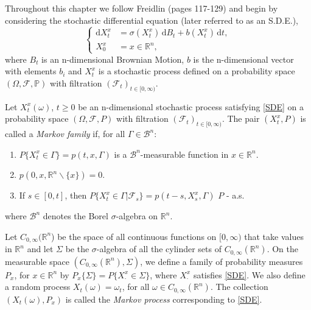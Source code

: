 \documentclass[a4paper,12pt,draft]{report}
\theoremstyle{remark}
\theoremstyle{definition}
\begin{document}
Throughout this chapter we follow Freidlin \cite{Freidlin} (pages 117-129) and begin by considering the stochastic differential equation (later referred to as an S.D.E.),
\begin{equation}
\left\{
\begin{aligned}
\mathrm{d}X_t^x & = \sigma(X_t^x)\,\mathrm{d}B_t + b(X_t^x)\,\mathrm{d}t,\\ \label{SDE}
X_0^x & = x \in \mathbb{R}^n,
\end{aligned}
\right.
\end{equation}
where $B_t$ is an n-dimensional Brownian Motion, $b$ is the n-dimensional vector with elements $b_i$ and $X_t^x$ is a stochastic process defined on a probability space $(\Omega, \mathscr{F}, \mathbb{P})$ with filtration $(\mathscr{F}_t)_{t \in [0, \infty)}$.
{
Let $X_t^x(\omega)$, $t \ge 0$ be an n-dimensional stochastic process satisfying \eqref{SDE} on a probability space $(\Omega, \mathscr{F}, P)$ with filtration $(\mathscr{F}_t)_{t \in [0, \infty)}$.  The pair $(X_t^x, P)$ is called a \emph{Markov family} if, for all $\Gamma \in \mathscr{B}^n$:
\begin{enumerate}
\item $P\{X_t^x \in \Gamma\} = p(t , x, \Gamma)$ is a $\mathscr{B}^n$-measurable function in $x \in \mathbb{R}^n$.
\item $p(0, x, \mathbb{R}^n\smallsetminus\{x\}) = 0$.
\item If $s \in [0, t]$, then $P\{X_t^x \in \Gamma | \mathscr{F}_s\} = p(t - s, X_s^x, \Gamma)$ $P$ - a.s.
\end{enumerate}
where $\mathscr{B}^n$ denotes the Borel $\sigma$-algebra on $\mathbb{R}^n$.
}
{
Let $C_{0, \infty}(\mathbb{R}^n$) be the space of all continuous functions on $[0, \infty)$ that take values in $\mathbb{R}^n$ and let $\Sigma$ be the $\sigma$-algebra of all the cylinder sets of $C_{0, \infty}(\mathbb{R}^n)$. On the measurable space $(C_{0, \infty}(\mathbb{R}^n), \Sigma)$, we define a family of probability measures $P_x$, for $x \in \mathbb{R}^n$ by $P_x\{\Sigma\} = P\{X_\cdot^x \in \Sigma\}$, where $X_\cdot^x$ satisfies \eqref{SDE}.  We also define a random process $X_t(\omega) = \omega_t$, for all $\omega \in C_{0, \infty}(\mathbb{R}^n)$.  The collection $(X_t(\omega), P_x)$ is called the \emph{Markov process} corresponding to \eqref{SDE}.
}
\end{document}
